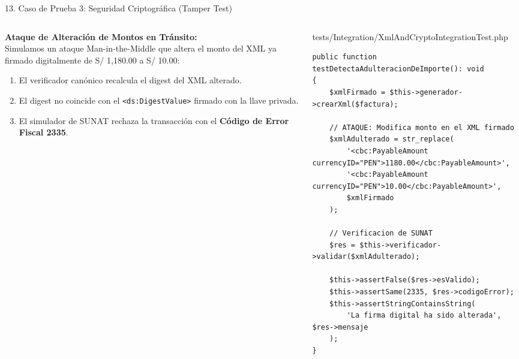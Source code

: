 \documentclass[aspectratio=169,10pt]{beamer}
\begin{document}
\begin{frame}[fragile]{13. Caso de Prueba 3: Seguridad Criptográfica (Tamper Test)}
\begin{columns}
\begin{column}{0.48\textwidth}
    \fontsize{6.8pt}{8.2pt}\selectfont\color{textwhite}
    \textbf{Ataque de Alteración de Montos en Tránsito:}\\[0.1cm]
    Simulamos un ataque Man-in-the-Middle que altera el monto del XML ya firmado digitalmente de S/ 1,180.00 a S/ 10.00:
    \vspace{0.08cm}
    \begin{enumerate}
        \item El verificador canónico recalcula el digest del XML alterado.
        \item El digest no coincide con el \texttt{<ds:DigestValue>} firmado con la llave privada.
        \item El simulador de SUNAT rechaza la transacción con el \textbf{Código de Error Fiscal 2335}.
    \end{enumerate}
\end{column}
\begin{column}{0.52\textwidth}
    \begin{codebox}{tests/Integration/XmlAndCryptoIntegrationTest.php}
\begin{lstlisting}
public function testDetectaAdulteracionDeImporte(): void 
{
    $xmlFirmado = $this->generador->crearXml($factura);

    // ATAQUE: Modifica monto en el XML firmado
    $xmlAdulterado = str_replace(
        '<cbc:PayableAmount currencyID="PEN">1180.00</cbc:PayableAmount>',
        '<cbc:PayableAmount currencyID="PEN">10.00</cbc:PayableAmount>',
        $xmlFirmado
    );

    // Verificacion de SUNAT
    $res = $this->verificador->validar($xmlAdulterado);

    $this->assertFalse($res->esValido);
    $this->assertSame(2335, $res->codigoError);
    $this->assertStringContainsString(
        'La firma digital ha sido alterada', $res->mensaje
    );
}
\end{lstlisting}
    \end{codebox}
\end{column}
\end{columns}
\end{frame}
\end{document}
